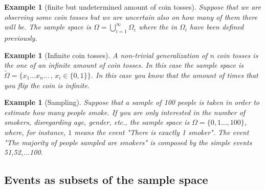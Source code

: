 \documentclass[12pt]{article}
\newtheorem{example}[theorem]{Example}
\newcommand{\<}{{\langle \!\! \langle}}
\renewcommand{\>}{{\rangle \!\! \rangle}}
\begin{document}
\begin{example}[finite but undetermined amount of coin tosses]
Suppose that we are observing some coin tosses but we are uncertain also on how many of them there will be. The sample space is $\Omega=\bigcup_{i=1}^\infty \Omega_i$ where the  in $\Omega_i$ have been defined previously. 

\end{example}

\begin{example}[Infinite coin tosses]
A non-trivial generalization of $n$ coin tosses is the one of an infinite amount of coin tosses. In this case the sample space is 
$\tilde{\Omega}=\{x_1...x_n...\, ,\, x_i\in\{0,1\}\}$. In this case you know that the amount of times that you flip the coin is infinite. 

 
\end{example}

%


\begin{example}[Sampling]
 Suppose that a sample of 100 people is taken in order to estimate how many people smoke. If you are only interested in the number of smokers, disregarding age, gender, etc., the sample space is  $\Omega=\{0,1...,100\}$, where, for instance, $1$ means the event "There is exactly 1 smoker". The event "The majority of people sampled are smokers" is composed by the simple events 51,52,...100.  
\end{example}



\subsection{Events as subsets of the sample space}
\end{document}
